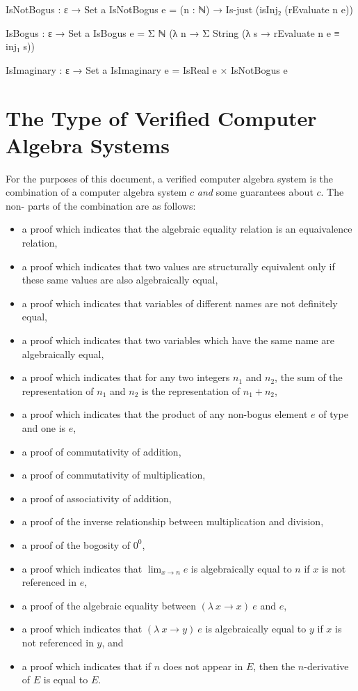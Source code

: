 \documentclass{report}
\begin{document}
\begin{code}
  IsNotBogus : ε → Set a
  IsNotBogus e = (n : ℕ) → Is-just (isInj₂ (rEvaluate n e))

  IsBogus : ε → Set a
  IsBogus e = Σ ℕ (λ n → Σ String (λ s → rEvaluate n e ≡ inj₁ s))

  IsImaginary : ε → Set a
  IsImaginary e = IsReal e × IsNotBogus e
\end{code}

\section{The Type of Verified Computer Algebra Systems}
For the purposes of this document, a verified computer algebra system is the combination of a  computer algebra system \(c\) \emph{and} some guarantees about \(c\).  The non- parts of the combination are as follows:

\begin{itemize}
 \item a proof which indicates that the algebraic equality relation is an equaivalence relation,
 \item a proof which indicates that two values are structurally equivalent only if these same values are also algebraically equal,
 \item a proof which indicates that variables of different names are not definitely equal,
 \item a proof which indicates that two variables which have the same name are algebraically equal,
 \item a proof which indicates that for any two integers \(n_1\) and \(n_2\), the sum of the representation of \(n_1\) and \(n_2\) is the representation of \(n_1 + n_2\),
 \item a proof which indicates that the product of any non-bogus element \(e\) of type  and one is \(e\),
 \item a proof of commutativity of addition,
 \item a proof of commutativity of multiplication,
 \item a proof of associativity of addition,
 \item a proof of the inverse relationship between multiplication and division,
 \item a proof of the bogosity of \(0^0\),
 \item a proof which indicates that \(\lim_{x \rightarrow n} e\) is algebraically equal to \(n\) if \(x\) is not referenced in \(e\),
 \item a proof of the algebraic equality between \(\left(\lambda\ x \rightarrow x\right)\ e\) and \(e\),
 \item a proof which indicates that \(\left(\lambda\ x \rightarrow y\right)\ e\) is algebraically equal to \(y\) if \(x\) is not referenced in \(y\), and
 \item a proof which indicates that if \(n\) does not appear in \(E\), then the \(n\)-derivative of \(E\) is equal to \(E\).
\end{itemize}
\end{document}
